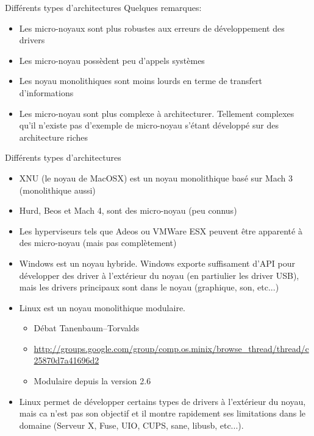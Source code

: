 \begin{frame}[fragile=singleslide]{Différents types d'architectures}
  Quelques remarques:
  \begin{itemize} 
  \item   Les  micro-noyaux   sont  plus   robustes  aux   erreurs  de
    développement des drivers
  \item Les micro-noyau possèdent peu d'appels systèmes
  \item  Les  noyau  monolithiques  sont  moins  lourds  en  terme  de
    transfert d'informations
  \item Les micro-noyau sont  plus complexe à architecturer. Tellement
    complexes  qu'il  n'existe pas  d'exemple  de micro-noyau  s'étant
    développé sur des architecture riches
  \end{itemize} 
\end{frame}


\begin{frame}[fragile=singleslide]{Différents types d'architectures}
  \begin{itemize} 
  \item XNU  (le noyau de MacOSX)  est un noyau  monolithique basé sur
    Mach 3 (monolithique aussi)
  \item Hurd, Beos et Mach 4, sont des micro-noyau (peu connus)
  \item Les  hyperviseurs tels  que Adeos ou  VMWare ESX  peuvent être
    apparenté à des micro-noyau (mais pas complètement)
  \item  Windows est  un  noyau hybride.  Windows exporte  suffisament
    d'API  pour  développer des  driver  à  l'extérieur  du noyau  (en
    partiulier les driver USB),  mais les drivers principaux sont dans
    le noyau (graphique, son, etc...)
  \item Linux est un noyau monolithique modulaire.
    \begin{itemize} 
    \item Débat Tanenbaum–Torvalds
    \item \url{http://groups.google.com/group/comp.os.minix/browse_thread/thread/c25870d7a41696d2}
    \item Modulaire depuis  la  version  2.6
    \end{itemize} 
  \item  Linux  permet  de  développer  certains types  de  drivers  à
    l'extérieur du noyau, mais ca  n'est pas son objectif et il montre
    rapidement ses limitations dans  le domaine (Serveur X, Fuse, UIO,
    CUPS, sane, libusb, etc...).
\end{itemize} 

\end{frame} 

